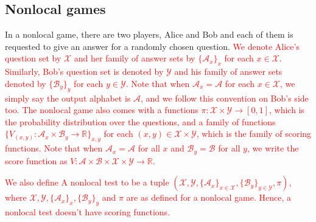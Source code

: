 \documentclass[11pt,letterpaper]{article}
\newcommand{\R}{\mathbb{R}}
\newcommand{\calX}{\mathcal{X}}
\newcommand{\calY}{\mathcal{Y}}
\newcommand{\calA}{\mathcal{A}}
\newcommand{\calB}{\mathcal{B}}
\newcommand{\1}{\mathbb{1}}
\newcommand{\hf}[1]{\textcolor{red}{#1}}
\theoremstyle{definition}
\begin{document}
\subsection{Nonlocal games}
In a nonlocal game, there are two players, Alice and Bob and each of them is requested
to give an answer for a randomly chosen question. 
\hf{We denote Alice's question set by $\calX$ and her family of answer sets by $\{\calA_x\}_x$
for each $x \in \calX$. Similarly,
Bob's question set is denoted by $\calY$ and his family of answer sets denoted by $\{\calB_y\}_y$ for each $y \in \calY$. 
Note that when $\calA_x = \calA$ for each $x \in \calX$, we simply say the output alphabet is $\calA$, and we follow this convention on Bob's side too.
The nonlocal game also
comes with a functions $\pi: \calX \times \calY \rightarrow [0,1]$, which is the probability distribution over the questions,
and a family of functions $\{ V_{(x,y)} : \calA_x \times \calB_y \rightarrow \R \}_{x,y}$ for each $(x,y) \in \calX \times \calY$, which is 
the family of scoring functions.
Note that when $\calA_x = \calA$ for all $x$ and $\calB_y = \calB$ for all $y$, we write the score function as 
$V: \calA \times \calB \times \calX \times \calY \rightarrow \R$.
}


\hf{We also define A nonlocal test 
to be a tuple $(\calX, \calY, \{\calA_x\}_{x \in \calX}, \{\calB_y\}_{y \in \calY}, \pi)$, where
$\calX, \calY, \{\calA_x\}_{x}, \{\calB_y\}_{y}$ and $\pi$ are as defined for a nonlocal game.
Hence, a nonlocal test doesn't have scoring functions.
}
\end{document}
